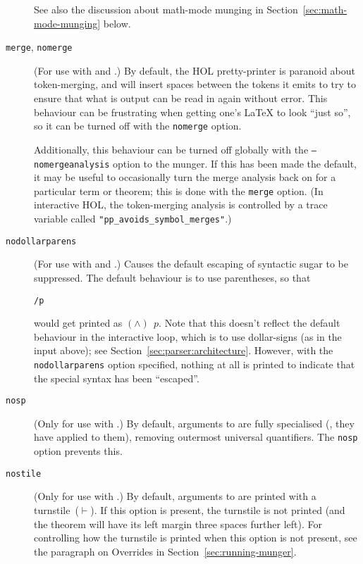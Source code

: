\begin{description}
See also the discussion about math-mode munging in Section~\ref{sec:math-mode-munging} below.

\item[\texttt{merge}, \texttt{nomerge}] (For use with \holtm{} and \holthm.)
By default, the HOL pretty-printer is paranoid about token-merging, and will insert spaces between the tokens it emits to try to ensure that what is output can be read in again without error.
%
This behaviour can be frustrating when getting one's \LaTeX{} to look ``just so'', so it can be turned off with the \texttt{nomerge} option.

Additionally, this behaviour can be turned off globally with the \texttt{--nomergeanalysis} option to the munger.
%
If this has been made the default, it may be useful to occasionally turn the merge analysis back on for a particular term or theorem; this is done with the \texttt{merge} option.
%
(In interactive HOL, the token-merging analysis is controlled by a trace variable called \texttt{"pp\_avoids\_symbol\_merges"}.)


\item[\texttt{nodollarparens}] (For use with \holtm{} and \holthm.) Causes the default escaping of syntactic sugar to be suppressed.
%
%
The default behaviour is to use parentheses, so that
\begin{alltt}
   \holtm\lb\dol/\bs p\rb
\end{alltt}
would get printed as $(\land)\;\,p$.
Note that this doesn't reflect the default behaviour in the interactive loop, which is to use dollar-signs (as in the input above); see Section~\ref{sec:parser:architecture}.
However, with the \texttt{nodollarparens} option specified, nothing at all is printed to indicate that the special syntax has been ``escaped''.

\item[\texttt{nosp}] (Only for use with \holthm.)
%
By default, arguments to \holthm{} are fully specialised (\ie, they have  applied to them), removing outermost universal quantifiers.
%
The \texttt{nosp} option prevents this.

\item[\texttt{nostile}] (Only for use with \holthm.)
%
By default, arguments to \holthm{} are printed with a turnstile~($\vdash$).
%
If this option is present, the turnstile is not printed (and the theorem will have its left margin three spaces further left).
%
For controlling how the turnstile is printed when this option is not present, see the paragraph on Overrides in Section~\ref{sec:running-munger}.


\end{description}
